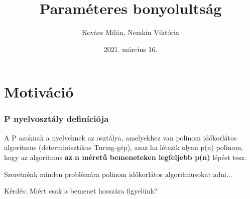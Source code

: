 \documentclass[aspectratio=169]{beamer}
\begin{document}
\title{Paraméteres bonyolultság}
\author{Kovács Milán, Nemkin Viktória}
\date{2021. március 16.}

\frame{\titlepage}



\section{Motiváció}

\begin{frame}
\frametitle{P nyelvosztály definíciója}

A P azoknak a nyelveknek az osztálya, amelyekhez van polinom időkorlátos
algoritmus (determinisztikus Turing-gép), azaz ha létezik olyan p(n) polinom, hogy
az algoritmus \textbf{az n méretű bemeneteken legfeljebb p(n)} lépést tesz.

Szeretnénk minden problémára polinom időkorlátos algoritmusokat adni...

Kérdés: Miért csak a bemenet hosszára figyelünk?

\end{frame}
\end{document}
